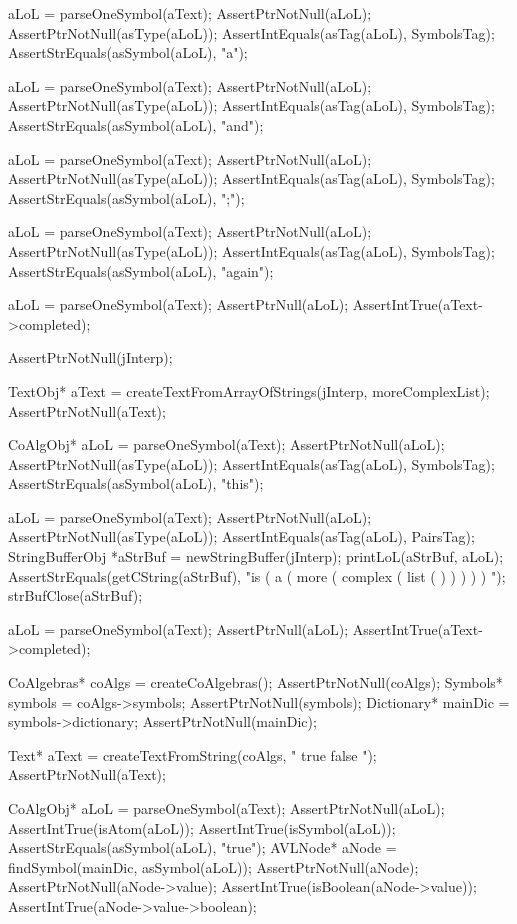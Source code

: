   aLoL = parseOneSymbol(aText);
  AssertPtrNotNull(aLoL);
  AssertPtrNotNull(asType(aLoL));
  AssertIntEquals(asTag(aLoL), SymbolsTag);
  AssertStrEquals(asSymbol(aLoL), "a");

  aLoL = parseOneSymbol(aText);
  AssertPtrNotNull(aLoL);
  AssertPtrNotNull(asType(aLoL));
  AssertIntEquals(asTag(aLoL), SymbolsTag);
  AssertStrEquals(asSymbol(aLoL), "and");

  aLoL = parseOneSymbol(aText);
  AssertPtrNotNull(aLoL);
  AssertPtrNotNull(asType(aLoL));
  AssertIntEquals(asTag(aLoL), SymbolsTag);
  AssertStrEquals(asSymbol(aLoL), ";");

  aLoL = parseOneSymbol(aText);
  AssertPtrNotNull(aLoL);
  AssertPtrNotNull(asType(aLoL));
  AssertIntEquals(asTag(aLoL), SymbolsTag);
  AssertStrEquals(asSymbol(aLoL), "again");

  aLoL = parseOneSymbol(aText);
  AssertPtrNull(aLoL);
  AssertIntTrue(aText->completed);
\stopCTest
\stopTestCase

\startCTest
  AssertPtrNotNull(jInterp);

  TextObj* aText = createTextFromArrayOfStrings(jInterp, moreComplexList);
  AssertPtrNotNull(aText);

  CoAlgObj* aLoL = parseOneSymbol(aText);
  AssertPtrNotNull(aLoL);
  AssertPtrNotNull(asType(aLoL));
  AssertIntEquals(asTag(aLoL), SymbolsTag);
  AssertStrEquals(asSymbol(aLoL), "this");

  aLoL = parseOneSymbol(aText);
  AssertPtrNotNull(aLoL);
  AssertPtrNotNull(asType(aLoL));
  AssertIntEquals(asTag(aLoL), PairsTag);
  StringBufferObj *aStrBuf = newStringBuffer(jInterp);
  printLoL(aStrBuf, aLoL);
  AssertStrEquals(getCString(aStrBuf),
    "is ( a ( more ( complex ( list ( ) ) ) ) ) ");
  strBufClose(aStrBuf);

  aLoL = parseOneSymbol(aText);
  AssertPtrNull(aLoL);
  AssertIntTrue(aText->completed);
\stopCTest
\stopTestCase

\startCTest
  CoAlgebras* coAlgs = createCoAlgebras();
  AssertPtrNotNull(coAlgs);
  Symbols* symbols = coAlgs->symbols;
  AssertPtrNotNull(symbols);
  Dictionary* mainDic = symbols->dictionary;
  AssertPtrNotNull(mainDic);

  Text* aText = createTextFromString(coAlgs, " true false ");
  AssertPtrNotNull(aText);

  CoAlgObj* aLoL = parseOneSymbol(aText);
  AssertPtrNotNull(aLoL);
  AssertIntTrue(isAtom(aLoL));
  AssertIntTrue(isSymbol(aLoL));
  AssertStrEquals(asSymbol(aLoL), "true");
  AVLNode* aNode = findSymbol(mainDic, asSymbol(aLoL));
  AssertPtrNotNull(aNode);
  AssertPtrNotNull(aNode->value);
  AssertIntTrue(isBoolean(aNode->value));
  AssertIntTrue(aNode->value->boolean);

